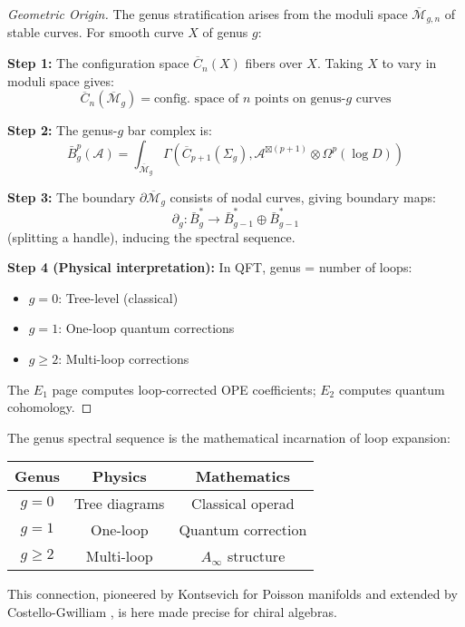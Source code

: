 \begin{proof}[Geometric Origin]
The genus stratification arises from the moduli space $\overline{\mathcal{M}}_{g,n}$ of 
stable curves. For smooth curve $X$ of genus $g$:

\textbf{Step 1:} The configuration space $\overline{C}_n(X)$ fibers over $X$. Taking $X$ 
to vary in moduli space gives:
$$\overline{C}_n(\overline{\mathcal{M}}_g) = \text{config. space of } n \text{ points on genus-}g \text{ curves}$$

\textbf{Step 2:} The genus-$g$ bar complex is:
$$\bar{B}^p_g(\mathcal{A}) = \int_{\overline{\mathcal{M}}_g} \Gamma(\overline{C}_{p+1}(\Sigma_g), 
\mathcal{A}^{\boxtimes (p+1)} \otimes \Omega^p(\log D))$$

\textbf{Step 3:} The boundary $\partial \overline{\mathcal{M}}_g$ consists of nodal curves, 
giving boundary maps:
$$\partial_g: \bar{B}^*_g \to \bar{B}^*_{g-1} \oplus \bar{B}^*_{g-1}$$
(splitting a handle), inducing the spectral sequence.

\textbf{Step 4 (Physical interpretation):} In QFT, genus = number of loops:
\begin{itemize}
\item $g=0$: Tree-level (classical)
\item $g=1$: One-loop quantum corrections
\item $g \geq 2$: Multi-loop corrections
\end{itemize}

The $E_1$ page computes loop-corrected OPE coefficients; $E_2$ computes quantum cohomology.
\end{proof}

\begin{remark}\label{rem:ss-feynman}
The genus spectral sequence is the mathematical incarnation of loop expansion:

\begin{center}
\begin{tabular}{|c|c|c|}
\hline
\textbf{Genus} & \textbf{Physics} & \textbf{Mathematics} \\
\hline
$g=0$ & Tree diagrams & Classical operad \\
$g=1$ & One-loop & Quantum correction \\
$g \geq 2$ & Multi-loop & $A_\infty$ structure \\
\hline
\end{tabular}
\end{center}

This connection, pioneered by Kontsevich for Poisson manifolds \cite{Kon99} and 
extended by Costello-Gwilliam \cite{CG17}, is here made precise for chiral algebras.
\end{remark}

